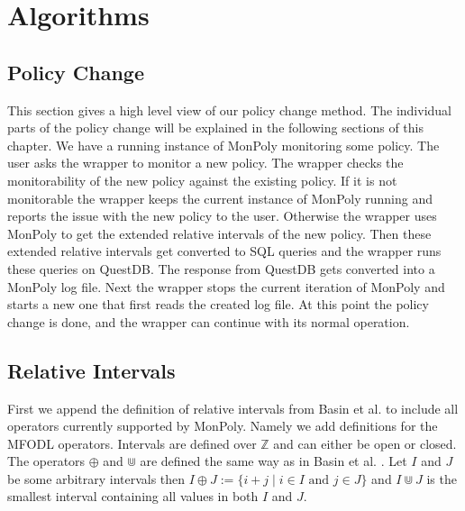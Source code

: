 \chapter{Algorithms}

\section{Policy Change}
This section gives a high level view of our policy change method.
The individual parts of the policy change will be explained in the following sections of this chapter.
We have a running instance of MonPoly monitoring some policy.
The user asks the wrapper to monitor a new policy.
The wrapper checks the monitorability of the new policy against the existing policy.
If it is not monitorable the wrapper keeps the current instance of MonPoly running and reports the issue with the new policy to the user.
Otherwise the wrapper uses MonPoly to get the extended relative intervals of the new policy.
Then these extended relative intervals get converted to SQL queries and the wrapper runs these queries on QuestDB.
The response from QuestDB gets converted into a MonPoly log file.
Next the wrapper stops the current iteration of MonPoly and starts a new one that first reads the created log file.
At this point the policy change is done, and the wrapper can continue with its normal operation.


\section{Relative Intervals}

First we append the definition of relative intervals from Basin et al. \cite{Basin2016} to include all operators currently supported by MonPoly.
Namely we add definitions for the MFODL operators.
Intervals are defined over $\mathbb{Z}$ and can either be open or closed.
The operators $\oplus$ and $\Cup$ are defined the same way as in Basin et al. \cite{Basin2016}.
Let $I$ and $J$ be some arbitrary intervals then $I \oplus J := \{i+j \mid i \in I \text{ and } j \in J\}$ and $I \Cup J$ is the smallest interval containing all values in both $I$ and $J$.

